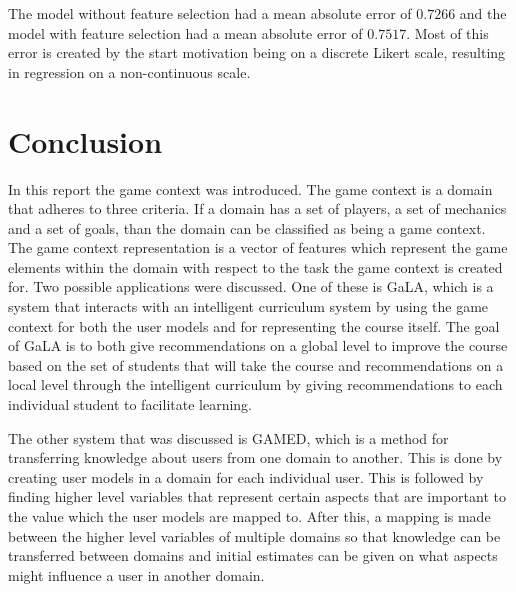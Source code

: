 \documentclass[11pt]{article}
\begin{document}
The model without feature selection had a mean absolute error of $0.7266$ and the model with feature selection had a mean absolute error of $0.7517$. Most of this error is created by the start motivation being on a discrete Likert scale, resulting in regression on a non-continuous scale.


% 


\section{Conclusion}
In this report the game context was introduced. The game context is a domain that adheres to three criteria. If a domain has a set of players, a set of mechanics and a set of goals, than the domain can be classified as being a game context. The game context representation is a vector of features which represent the game elements within the domain with respect to the task the game context is created for. Two possible applications were discussed. One of these is GaLA, which is a system that interacts with an intelligent curriculum system by using the game context for both the user models and for representing the course itself. The goal of GaLA is to both give recommendations on a global level to improve the course based on the set of students that will take the course and recommendations on a local level through the intelligent curriculum by giving recommendations to each individual student to facilitate learning.

The other system that was discussed is GAMED, which is a method for transferring knowledge about users from one domain to another. This is done by creating user models in a domain for each individual user. This is followed by finding higher level variables that represent certain aspects that are important to the value which the user models are mapped to. After this, a mapping is made between the higher level variables of multiple domains so that knowledge can be transferred between domains and initial estimates can be given on what aspects might influence a user in another domain.
\end{document}
